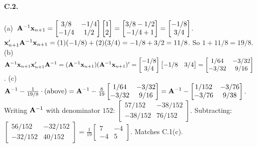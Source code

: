 \documentclass{article}
\begin{document}
\paragraph{C.2.}  (a)~${\mathbf A}^{-1}\mathbf x_{n+1} = \begin{bmatrix}3/8 & -1/4\\ -1/4 & 1/2\end{bmatrix}\begin{bmatrix}1\\ 2\end{bmatrix} = \begin{bmatrix}3/8 - 1/2\\ -1/4 + 1\end{bmatrix} = \begin{bmatrix}-1/8\\ 3/4\end{bmatrix}$.  $\mathbf x_{n+1}'{\mathbf A}^{-1}\mathbf x_{n+1} = (1)(-1/8) + (2)(3/4) = -1/8 + 3/2 = 11/8$.  So $1 + 11/8 = 19/8$.  (b)~${\mathbf A}^{-1}\mathbf x_{n+1}\mathbf x_{n+1}'{\mathbf A}^{-1} = ({\mathbf A}^{-1}\mathbf x_{n+1})({\mathbf A}^{-1}\mathbf x_{n+1})' = \begin{bmatrix}-1/8\\ 3/4\end{bmatrix}\begin{bmatrix}-1/8 & 3/4\end{bmatrix} = \begin{bmatrix}1/64 & -3/32\\ -3/32 & 9/16\end{bmatrix}$.  (c)~${\mathbf A}^{-1} - \frac{1}{19/8}\cdot\text{(above)} = {\mathbf A}^{-1} - \frac{8}{19}\begin{bmatrix}1/64 & -3/32\\ -3/32 & 9/16\end{bmatrix} = {\mathbf A}^{-1} - \begin{bmatrix}1/152 & -3/76\\ -3/76 & 9/38\end{bmatrix}$.  Writing ${\mathbf A}^{-1}$ with denominator $152$: $\begin{bmatrix}57/152 & -38/152\\ -38/152 & 76/152\end{bmatrix}$.  Subtracting: $\begin{bmatrix}56/152 & -32/152\\ -32/152 & 40/152\end{bmatrix} = \frac{1}{19}\begin{bmatrix}7 & -4\\ -4 & 5\end{bmatrix}$.  Matches C.1(c). \checkmark
\end{document}
